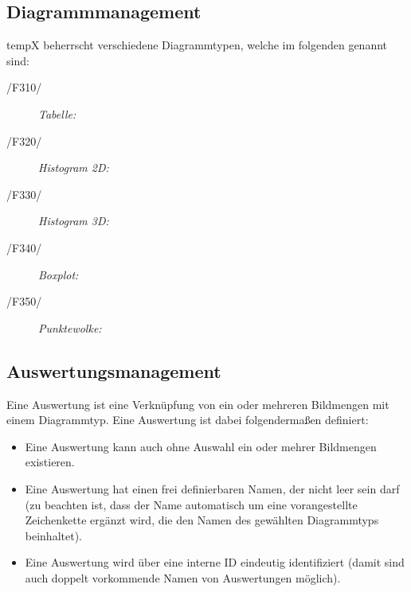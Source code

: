 \subsection{Diagrammmanagement}

\label{subsec:diagrammmgmt}

	\gls{tempX} beherrscht verschiedene Diagrammtypen, welche im folgenden genannt sind:
	
	\begin{description}

		\item[/F310/] \textit{Tabelle:}\par 
		

		\item[/F320/] \textit{Histogram 2D:}\par 
		
		
		\item[/F330/] \textit{Histogram 3D:}\par 
		

		\item[/F340/] \textit{Boxplot:}\par 

		\item[/F350/] \textit{Punktewolke:}\par 

	\end{description}

\subsection{Auswertungsmanagement}
\label{subsec:auswertungsmgmt}

	Eine Auswertung ist eine Verknüpfung von ein oder mehreren Bildmengen mit einem Diagrammtyp. Eine Auswertung ist dabei folgendermaßen definiert:

	\begin{itemize}

		\item Eine Auswertung kann auch ohne Auswahl ein oder mehrer Bildmengen existieren. 

		\item Eine Auswertung hat einen frei definierbaren Namen, der nicht leer sein darf (zu beachten ist, dass der Name automatisch um eine vorangestellte Zeichenkette ergänzt wird, die den Namen des gewählten Diagrammtyps beinhaltet).

		\item Eine Auswertung wird über eine interne ID eindeutig identifiziert (damit sind auch doppelt vorkommende Namen von Auswertungen möglich).

	\end{itemize}

